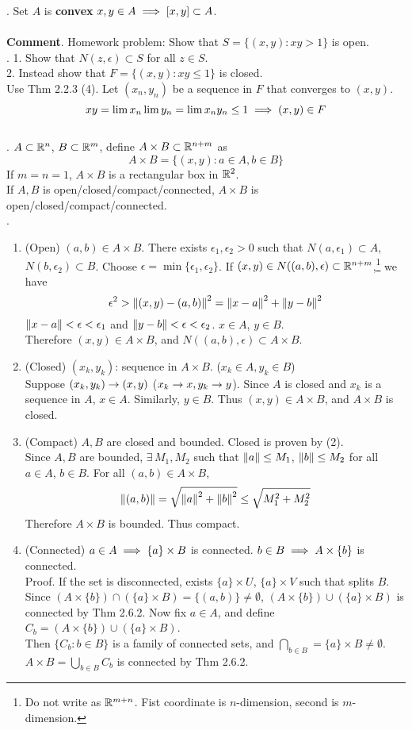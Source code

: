. Set $A$ is \textbf{convex} \miff $x, y\in A \implies [x, y]\subset A$.\\
\\
\textbf{Comment}. Homework problem: Show that $S = \{(x, y):xy>1 \}$ is open.\\
\pf. 1. Show that $N(z, \epsilon) \subset S$ for all $z\in S$.\\
2. Instead show that $F = \{(x, y) : xy \leq1\}$ is closed.\\
Use Thm 2.2.3 (4). Let $(x_n, y_n)$ be a sequence in $F$ that converges to $(x, y)$. $$xy = \lim x_n \lim y_n = \lim x_ny_n \leq 1 \implies (x, y)\in F$$
\\
\ex. $A\subset \mathbb{R}^n$, $B\subset \mathbb{R}^m$, define $A\times B \subset \mathbb{R}^{n+m}$ as $$A\times B = \{(x, y) : a\in A, b\in B\}$$
If $m=n=1$, $A\times B$ is a rectangular box in $\mathbb{R}^2$.\\
If $A, B$ is open/closed/compact/connected, $A\times B$ is open/closed/compact/connected.\\
\pf.
\begin{enumerate}
	\item (Open) $(a, b)\in A\times B$. There exists $\epsilon_1, \epsilon_2 >0$ such that $N(a, \epsilon_1)\subset A$, $N(b, \epsilon_2)\subset B$. Choose $\epsilon = \min \{\epsilon_1, \epsilon_2\}$. If $(x, y)\in N((a, b), \epsilon) \subset \mathbb{R}^{n+m}$,\footnote{Do not write as $\mathbb{R}^{m+n}$. Fist coordinate is $n$-dimension, second is $m$-dimension.} we have $$ \epsilon^2 > \left\lVert(x, y) - (a, b)\right\rVert^2 = \left\lVert x-a\right\rVert^2 + \left\lVert y - b\right\rVert^2$$
	$\left\lVert x-a\right\rVert < \epsilon < \epsilon_1$ and $\left\lVert y - b\right\rVert <\epsilon < \epsilon_2$. $x\in A$, $y\in B$.\\
	Therefore $(x, y)\in A\times B$, and $N((a, b), \epsilon) \subset A\times B$.
	\item (Closed) $(x_k, y_k)$: sequence in $A\times B$. ($x_k \in A, y_k\in B$) \\
	Suppose $(x_k, y_k) \rightarrow (x, y)$ ($x_k\rightarrow x, y_k\rightarrow y$). Since $A$ is closed and $x_k$ is a sequence in $A$, $x\in A$. Similarly, $y\in B$. Thus $(x, y)\in A\times B$, and $A\times B$ is closed.
	\item (Compact) $A, B$ are closed and bounded. Closed is proven by (2).\\
	Since $A, B$ are bounded, $\exists\, M_1, M_2$ such that $\left\lVert a\right\rVert\leq M_1$, $\left\lVert b\right\rVert\leq M_2$ for all $a\in A$, $b\in B$. For all $(a, b)\in A\times B$, $$\left\lVert(a, b)\right\rVert = \sqrt{\left\lVert a\right\rVert^2 +\left\lVert b\right\rVert^2} \leq \sqrt{M_1^2+M_2^2}$$ Therefore $A\times B$ is bounded. Thus compact.
	\item (Connected)
	$a\in A \implies \{a\}\times B$ is connected. $b\in B \implies A \times \{b\}$ is connected.\\
	Proof. If the set is disconnected, exists $\{a\} \times U$, $\{a\} \times V$ such that splits $B$.\\
	Since $(A\times \{b\}) \cap (\{a\}\times B) = \{(a, b)\}\neq \emptyset$, $(A\times \{b\}) \cup (\{a\}\times B)$ is connected by Thm 2.6.2. Now fix $a\in A$, and define $C_b = (A\times \{b\}) \cup (\{a\}\times B)$.\\
	Then $\{C_b:b\in B\}$ is a family of connected sets, and $\bigcap_{b\in B} = \{a\}\times B \neq \emptyset$. $A\times B = \bigcup_{b\in B} C_b$ is connected by Thm 2.6.2.
\end{enumerate}
\pagebreak